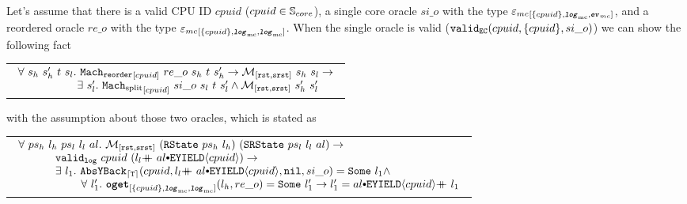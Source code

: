 \begin{lemma}
\label{lemma:chapter:conlink:reorder-refines-split}
%
Let's assume that there is a valid CPU ID $cpuid$ ($cpuid \in {\mathbb{S}_{core}}$),
a single core oracle $si\_o$ with the type $ {{{\varepsilon_{mc}}}_{[{\{cpuid\}}, {{{\mathrm{\texttt{\textbf{\textit{log}}}}}_{\mathrm{mc}}}}, {{{\mathrm{\texttt{\textbf{\textit{ev}}}}}_{mc}}}]}}$, and a reordered oracle $re\_o$ with the type ${{{\varepsilon_{mc}}}_{[{\{cpuid\}}, {{{\mathrm{\texttt{\textbf{\textit{log}}}}}_{\mathrm{mc}}}}, {{{\mathrm{\texttt{\textbf{\textit{log}}}}}_{\mathrm{mc}}}}]}}$.
When the single oracle is valid ($ {{\mathrm{\texttt{valid}}}_{{\mathrm{\texttt{EC}}}}}({cpuid}, {\{cpuid\}}, {si\_o})$) we can show the following fact
\begin{center}
\begin{tabular}{P{0.95\textwidth}}
$
\begin{array}{l}
\forall \ s_h \ s_h' \ t \ s_l . \ \singlereorderstep{cpuid}{re\_o}{s_h}{t}{s_h'} \rightarrow  \matchrstatesrstate{s_h}{s_l} \rightarrow \\
\ \ \ \ \ \ \ \ \ \ \ \ \ \ \ \ \exists\ s_l' .\ \singlesplitstep{cpuid}{si\_o}{s_l}{t}{s_l'} \wedge  \matchrstatesrstate{s_h'}{s_l'}\\
\end{array}
$
\end{tabular}
\end{center}
with the assumption about those two oracles, which is stated as 
\begin{center}
\begin{tabular}{P{0.95\textwidth}}
$
\begin{array}{l}
\forall \ ps_h \ l_h \ ps_l \ l_l \ al.\ \matchrstatesrstate{(\rstate{ps_h}{l_h})}{(\srstate{ps_l}{l_l}{al})} \rightarrow \\
\ \ \ \ \ \ \ \ \ \ \validlog{cpuid}{(\listconsoppo{\yieldev{cpuid}}{\listappoppo{al}{l_l}})} \rightarrow \\
\ \ \ \ \ \ \ \ \ \ \exists\ l_1. \ \yieldbackfunc{\timebound}{cpuid}{\listconsoppo{\yieldev{cpuid}}{\listappoppo{al}{l_l}}}{\nulllist}{si\_o}{l_1} \wedge \\ 
\ \ \ \ \ \ \ \ \ \ \ \ \ \ \ \ \ \forall \ l_1' .\  \oget{\set{cpuid}}{\mclog}{\mclog}{l_h}{re\_o}{l_1'} \rightarrow  l_1' = \listappoppo{l_1}{\listconsoppo{\yieldev{cpuid}}{al}} \\
\end{array}
$
\end{tabular}
\end{center}

\end{lemma}

